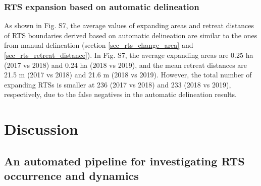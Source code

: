 \documentclass[authoryear,preprint,review,12pt]{elsarticle}
\begin{document}
 


\subsubsection{RTS expansion based on automatic delineation}
\label{sec_rts_change_auto_mapping}

As shown in Fig. S7, the average values of expanding areas and retreat distances of RTS boundaries derived based on automatic delineation are similar to the ones from manual delineation (section \ref{sec_rts_change_area} and \ref{sec_rts_retreat_distance}).
In Fig. S7, the average expanding areas are 0.25 ha (2017 vs 2018) and 0.24 ha (2018 vs 2019), and the mean retreat distances are 21.5 m (2017 vs 2018)  and 21.6 m (2018 vs 2019). 
However, the total number of expanding RTSs is smaller at 236 (2017 vs 2018) and 233 (2018 vs 2019), respectively, due to the false negatives in the automatic delineation results.

 

\section{Discussion}
\label{sec_discussion}


\subsection{An automated pipeline for investigating RTS occurrence and dynamics}
\label{sec_diss_auto_pipeline}
\end{document}
